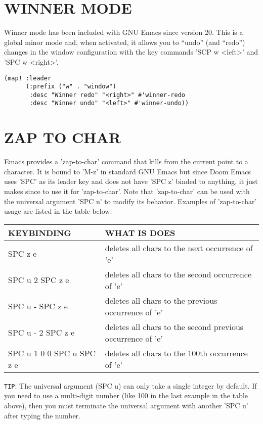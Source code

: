 \documentclass[11pt]{article}
\begin{document}
\section{WINNER MODE}
\label{sec:org62450ae}
Winner mode has been included with GNU Emacs since version 20.  This is a global minor mode and, when activated, it allows you to “undo” (and “redo”) changes in the window configuration with the key commands 'SCP w <left>' and 'SPC w <right>'.

\begin{verbatim}
(map! :leader
      (:prefix ("w" . "window")
       :desc "Winner redo" "<right>" #'winner-redo
       :desc "Winner undo" "<left>" #'winner-undo))
\end{verbatim}

\section{ZAP TO CHAR}
\label{sec:org99ccb26}
Emacs provides a 'zap-to-char' command that kills from the current point to a character.  It is bound to 'M-z' in standard GNU Emacs but since Doom Emacs uses 'SPC' as its leader key and does not have 'SPC z' binded to anything, it just makes since to use it for 'zap-to-char'.  Note that 'zap-to-char' can be used with the universal argument 'SPC u' to modify its behavior.  Examples of 'zap-to-char' usage are listed in the table below:

\begin{center}
\begin{tabular}{ll}
KEYBINDING & WHAT IS DOES\\[0pt]
\hline
SPC z e & deletes all chars to the next occurrence of 'e'\\[0pt]
SPC u 2 SPC z e & deletes all chars to the second occurrence of 'e'\\[0pt]
SPC u - SPC z e & deletes all chars to the previous occurrence of 'e'\\[0pt]
SPC u - 2 SPC z e & deletes all chars to the second previous occurrence of 'e'\\[0pt]
SPC u 1 0 0 SPC u SPC z e & deletes all chars to the 100th occurrence of 'e'\\[0pt]
\end{tabular}
\end{center}

\texttt{TIP}: The universal argument (SPC u) can only take a single integer by default.  If you need to use a multi-digit number (like 100 in the last example in the table above), then you must terminate the universal argument with another 'SPC u' after typing the number.
\end{document}
